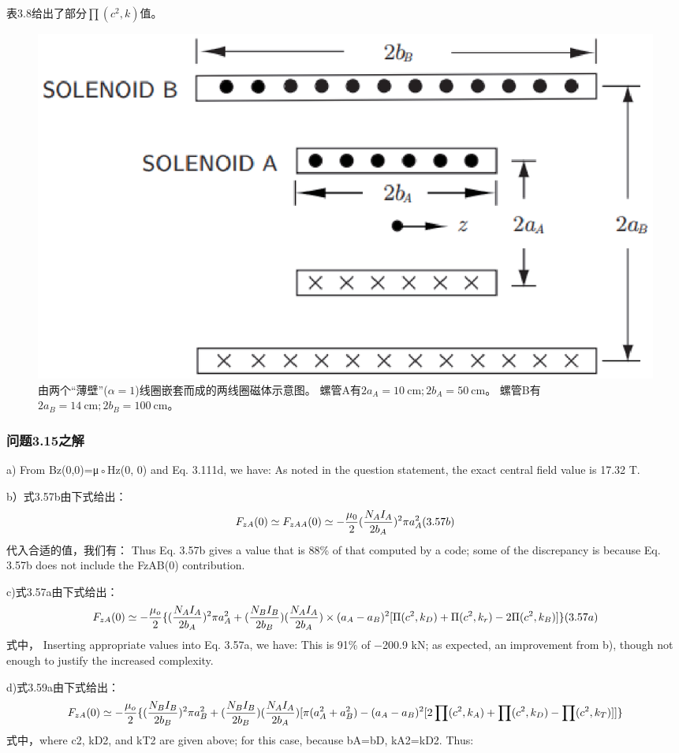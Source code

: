 表3.8给出了部分$\prod(c^2,k)$值。

\begin{figure}[htbp]
	\centering
	\includegraphics[scale=0.5]{chpt3/figs/fig3.44.eps}
	\caption{由两个“薄壁”($\alpha = 1$)线圈嵌套而成的两线圈磁体示意图。
		螺管A有$2a_A=10\ \mathrm{cm};2b_A = 50\ \mathrm{cm}$。
		螺管B有$2a_B = 14\ \mathrm{cm}; 2b_B = 100\ \mathrm{cm}$。}
\end{figure}

\subsubsection{问题3.15之解}
a) From Bz(0,0)=μ◦Hz(0, 0) and Eq. 3.111d, we have:
As noted in the question statement, the exact central field value is 17.32 T.

b）式3.57b由下式给出：
$$
F_{zA}(0)\simeq F_{zAA}(0)\simeq-\frac{\mu_{0}}{2}(\frac{N_{A}I_{A}}{2b_{A}})^{2}\pi a_{A}^{2}\\(3.57b)
$$
代入合适的值，我们有：
Thus Eq. 3.57b gives a value that is 88\% of that computed by a code; some of the
discrepancy is because Eq. 3.57b does not include the FzAB(0) contribution.

c)式3.57a由下式给出：
$$
F_{zA}(0)\simeq-\frac{\mu_{o}}{2}\{(\frac{N_{A}I_{A}}{2b_{A}})^{2}\pi a_{A}^{2}+(\frac{N_{B}I_{B}}{2b_{B}})(\frac{N_{A}I_{A}}{2b_{A}})\times\\
(a_{A}-a_{B})^{2}[\Pi(c^{2},k_{D})+\Pi(c^{2},k_{r})-2\Pi(c^{2},k_{B})]\}\\(3.57a)
$$
式中，
Inserting appropriate values into Eq. 3.57a, we have:
This is 91\% of −200.9 kN; as expected, an improvement from b), though not
enough to justify the increased complexity.

d)式3.59a由下式给出：
$$
F_{zA}(0)\simeq-\frac{\mu_{o}}{2}\{(\frac{N_{B}I_{B}}{2b_{B}})^{2}\pi a_{B}^{2}+(\frac{N_{B}I_{B}}{2b_{B}})(\frac{N_{A}I_{A}}{2b_{A}})[\pi(a_{A}^{2}+a_{B}^{2})\\
-(a_{A}-a_{B})^{2}[2\prod(c^{2},k_{A})+\prod(c^{2},k_{D})-\prod(c^{2},k_{T})]]\}\\%
$$
式中，where c2, kD2, and kT2 are given above; for this case, because bA=bD, kA2=kD2. Thus:

